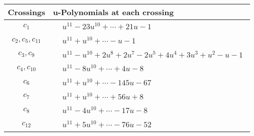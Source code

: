 \documentclass[1p]{elsarticle_modified}
\theoremstyle{definition}
\begin{document}
\begin{tabular}{m{50pt}|m{274pt}}
Crossings & \hspace{64pt}u-Polynomials at each crossing \\
\hline $$\begin{aligned}c_{1}\end{aligned}$$&$\begin{aligned}
&u^{11}-23 u^{10}+\cdots+21 u-1
\end{aligned}$\\
\hline $$\begin{aligned}c_{2},c_{5},c_{11}\end{aligned}$$&$\begin{aligned}
&u^{11}+u^{10}+\cdots- u-1
\end{aligned}$\\
\hline $$\begin{aligned}c_{3},c_{9}\end{aligned}$$&$\begin{aligned}
&u^{11}- u^{10}+2 u^8+2 u^7-2 u^5+4 u^4+3 u^3+u^2- u-1
\end{aligned}$\\
\hline $$\begin{aligned}c_{4},c_{10}\end{aligned}$$&$\begin{aligned}
&u^{11}-8 u^{10}+\cdots+4 u-8
\end{aligned}$\\
\hline $$\begin{aligned}c_{6}\end{aligned}$$&$\begin{aligned}
&u^{11}+u^{10}+\cdots-145 u-67
\end{aligned}$\\
\hline $$\begin{aligned}c_{7}\end{aligned}$$&$\begin{aligned}
&u^{11}+u^{10}+\cdots+56 u+8
\end{aligned}$\\
\hline $$\begin{aligned}c_{8}\end{aligned}$$&$\begin{aligned}
&u^{11}-4 u^{10}+\cdots-17 u-8
\end{aligned}$\\
\hline $$\begin{aligned}c_{12}\end{aligned}$$&$\begin{aligned}
&u^{11}+5 u^{10}+\cdots-76 u-52
\end{aligned}$\\
\hline
\end{tabular}\\~\\
\end{document}
